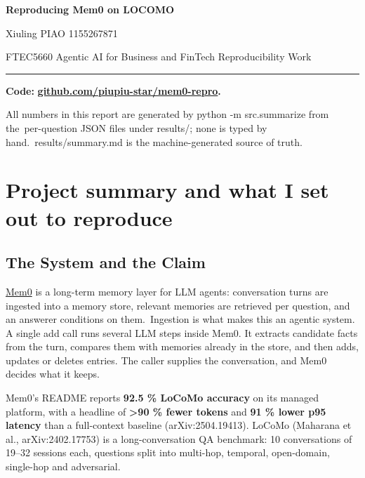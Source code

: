 \documentclass[11pt,a4paper]{article}
\begin{document}
\begin{center}
{\LARGE\bfseries Reproducing Mem0 on LOCOMO\par}
\vspace{0.35em}
{\large Xiuling PIAO \textperiodcentered{} 1155267871\par}
\vspace{0.25em}
{\small FTEC5660 Agentic AI for Business and FinTech \textperiodcentered{}
 Reproducibility Work\par}
\vspace{0.5em}
\rule{0.55\textwidth}{0.4pt}
\end{center}
\vspace{0.6em}

\textbf{Code: }\href{https://github.com/piupiu-star/mem0-repro}{\textbf{github.com/piupiu-star/mem0-repro}}\textbf{.}

All numbers in this report are generated by python -m src.summarize from the~per-question JSON files under results/; none is typed by hand.~results/summary.md is the machine-generated source of truth.

\section{Project summary and what I set out to reproduce}

\subsection{The System and the Claim}

\href{https://github.com/mem0ai/mem0}{Mem0} is a long-term memory layer for LLM agents: conversation turns are ingested into a memory store, relevant memories are retrieved per question, and an answerer conditions on them.~Ingestion is what makes this an agentic system. A single add call runs several LLM steps inside Mem0. It extracts candidate facts from the turn, compares them with memories already in the store, and then adds, updates or deletes entries. The caller supplies the conversation, and Mem0 decides what it keeps.

Mem0's README reports \textbf{92.5 \% LoCoMo accuracy} on its managed platform, with a headline of \textbf{>90 \% fewer tokens} and \textbf{91 \% lower p95 latency} than a full-context baseline (arXiv:2504.19413). LoCoMo (Maharana et al., arXiv:2402.17753) is a long-conversation QA benchmark: 10 conversations of 19--32 sessions each, questions split into multi-hop, temporal, open-domain, single-hop and adversarial.
\end{document}
